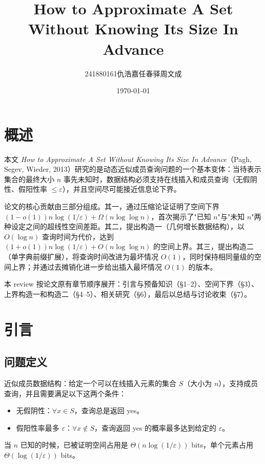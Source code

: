 \documentclass[UTF8,11pt,a4paper]{ctexart}
\title{\Huge\textbf{How to Approximate A Set\\Without Knowing Its Size In Advance}\\[0.5em]}
\author{241880161\quad 仇浩嘉\quad\quad241880136\quad 任春驿\quad\quad241880070\quad 周文成}
\date{\today}
\begin{document}
\maketitle

\vspace{-1.2em}
\begingroup
\small
\setlength{\parskip}{0pt}
\tableofcontents
\endgroup
\newpage

\section{概述}

本文 \textit{How to Approximate A Set Without Knowing Its Size In Advance}（Pagh, Segev, Wieder, 2013）研究的是动态近似成员查询问题的一个基本变体：当待表示集合的最终大小 $n$ 事先未知时，数据结构必须支持在线插入和成员查询（无假阴性、假阳性率 $\le\varepsilon$），并且空间尽可能接近信息论下界。

论文的核心贡献由三部分组成。其一，通过压缩论证证明了空间下界 $(1-o(1))n\log(1/\varepsilon)+\Omega(n\log\log n)$，首次揭示了"已知 $n$"与"未知 $n$"两种设定之间的超线性空间差距。其二，提出构造一（几何增长数据结构），以 $O(\log n)$ 查询时间为代价，达到 $(1+o(1))n\log(1/\varepsilon)+O(n\log\log n)$ 的空间上界。其三，提出构造二（单字典前缀扩展），将查询时间改进为最坏情况 $O(1)$，同时保持相同量级的空间上界；并通过去摊销化进一步给出插入最坏情况 $O(1)$ 的版本。

本 review 按论文原有章节顺序展开：引言与预备知识（§1–2）、空间下界（§3）、上界构造一和构造二（§4–5）、相关研究（§6），最后以总结与讨论收束（§7）。

\section{引言}

\subsection{问题定义}

近似成员数据结构：给定一个可以在线插入元素的集合 $S$（大小为 $n$），支持成员查询，并且需要满足以下这两个条件：
\begin{itemize}
    \item 无假阴性：$\forall x \in S$，查询总是返回 yes。
    \item 假阳性率最多 $\varepsilon$：$\forall x \notin S$，查询返回 yes 的概率最多达到给定的 $\varepsilon$。
\end{itemize}

当 $n$ 已知的时候，已被证明空间占用是 $\Theta(n\log(1/\varepsilon))$ bits，单个元素占用 $\Theta(\log(1/\varepsilon))$ bits。
\end{document}
